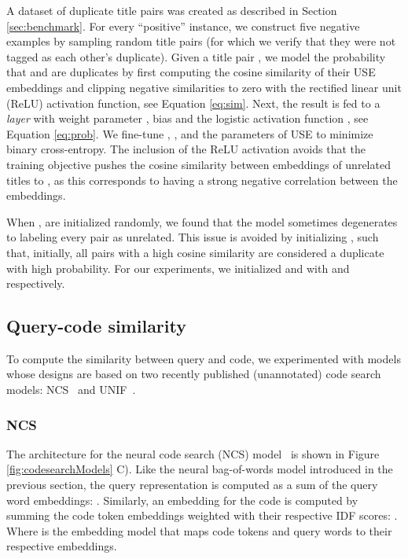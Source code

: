 \documentclass[12pt,conference, onecolumn]{IEEEtran}
\begin{document}
A dataset of duplicate title pairs was created as described in Section \ref{sec:benchmark}. For every ``positive'' instance, we construct five negative examples by sampling random title pairs (for which we verify that they were not tagged as each other's duplicate). Given a title pair , we model the probability that  and  are duplicates by first computing the cosine similarity of their USE embeddings and clipping negative similarities to zero with the rectified linear unit (ReLU) activation function, see Equation \ref{eq:sim}. Next, the result is fed to a \textit{layer} with weight parameter , bias  and the logistic activation function , see Equation \ref{eq:prob}. We fine-tune , , and the parameters of USE  to minimize binary cross-entropy. The inclusion of the ReLU activation avoids that the training objective pushes the cosine similarity between embeddings of unrelated titles to , as this corresponds to having a strong negative correlation between the embeddings. 


When ,  are initialized randomly, we found that the model sometimes degenerates to labeling every pair as unrelated. This issue is avoided by initializing ,  such that, initially, all pairs with a high cosine similarity are considered a duplicate with high probability. For our experiments, we initialized  and  with  and  respectively. 

\subsection{Query-code similarity}\label{sec:code-sim}
To compute the similarity between query and code, we experimented with models whose designs are based on two recently published  (unannotated) code search models: NCS~\cite{sachdev2018retrieval} and UNIF~\cite{cambronero2019deep}. 


\subsubsection*{NCS}
The architecture for the neural code search (NCS) model~\cite{sachdev2018retrieval} is shown in Figure \ref{fig:codesearchModels} C). Like the neural bag-of-words model introduced in the previous section, the query representation is computed as a sum of the query word embeddings: . Similarly, an embedding for the code is computed by summing the code token embeddings weighted with their respective IDF scores: . Where  is the embedding model that maps code tokens and query words to their respective embeddings. 
\end{document}
